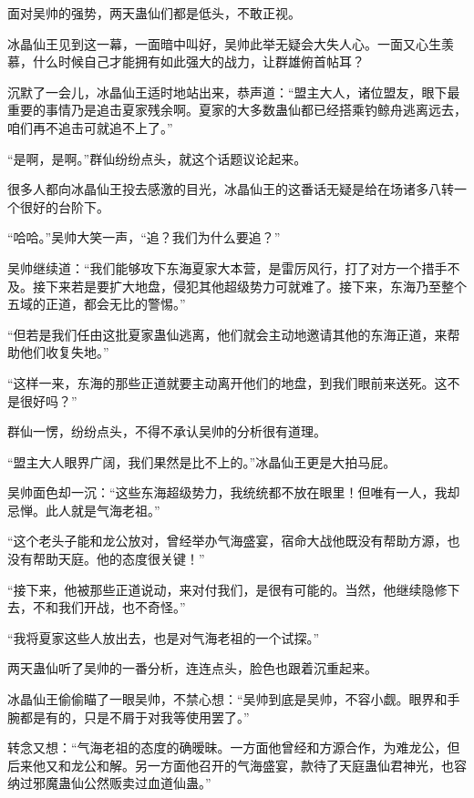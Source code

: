 
\begin{this_body}



面对吴帅的强势，两天蛊仙们都是低头，不敢正视。

冰晶仙王见到这一幕，一面暗中叫好，吴帅此举无疑会大失人心。一面又心生羡慕，什么时候自己才能拥有如此强大的战力，让群雄俯首帖耳？

沉默了一会儿，冰晶仙王适时地站出来，恭声道：“盟主大人，诸位盟友，眼下最重要的事情乃是追击夏家残余啊。夏家的大多数蛊仙都已经搭乘钓鲸舟逃离远去，咱们再不追击可就追不上了。”

“是啊，是啊。”群仙纷纷点头，就这个话题议论起来。

很多人都向冰晶仙王投去感激的目光，冰晶仙王的这番话无疑是给在场诸多八转一个很好的台阶下。

“哈哈。”吴帅大笑一声，“追？我们为什么要追？”

吴帅继续道：“我们能够攻下东海夏家大本营，是雷厉风行，打了对方一个措手不及。接下来若是要扩大地盘，侵犯其他超级势力可就难了。接下来，东海乃至整个五域的正道，都会无比的警惕。”

“但若是我们任由这批夏家蛊仙逃离，他们就会主动地邀请其他的东海正道，来帮助他们收复失地。”

“这样一来，东海的那些正道就要主动离开他们的地盘，到我们眼前来送死。这不是很好吗？”

群仙一愣，纷纷点头，不得不承认吴帅的分析很有道理。

“盟主大人眼界广阔，我们果然是比不上的。”冰晶仙王更是大拍马屁。

吴帅面色却一沉：“这些东海超级势力，我统统都不放在眼里！但唯有一人，我却忌惮。此人就是气海老祖。”

“这个老头子能和龙公放对，曾经举办气海盛宴，宿命大战他既没有帮助方源，也没有帮助天庭。他的态度很关键！”

“接下来，他被那些正道说动，来对付我们，是很有可能的。当然，他继续隐修下去，不和我们开战，也不奇怪。”

“我将夏家这些人放出去，也是对气海老祖的一个试探。”

两天蛊仙听了吴帅的一番分析，连连点头，脸色也跟着沉重起来。

冰晶仙王偷偷瞄了一眼吴帅，不禁心想：“吴帅到底是吴帅，不容小觑。眼界和手腕都是有的，只是不屑于对我等使用罢了。”

转念又想：“气海老祖的态度的确暧昧。一方面他曾经和方源合作，为难龙公，但后来他又和龙公和解。另一方面他召开的气海盛宴，款待了天庭蛊仙君神光，也容纳过邪魔蛊仙公然贩卖过血道仙蛊。”


\end{this_body}
